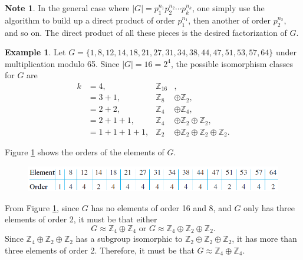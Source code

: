 \documentclass{article}
\theoremstyle{definition}
\newtheorem{example}{Example}[section]
\newtheorem{note}{Note}[section]
\begin{document}
\begin{note}
        In the general case where $|G|=p_1^{n_1}p_2^{n_2}\cdots p_k^{n_k}$, one simply use the algorithm to build up a direct product of order $p_1^{n_1}$, then another of order $p_2^{n_2}$, and so on. The direct product of all these pieces is the desired factorization of $G$.
    \end{note}
   
   \begin{example}
    Let $G=\{1,8,12,14,18,21,27,31,34,38,44,47,51,53,57,64\}$ under multiplication modulo 65. Since $|G|=16=2^4$,  the possible isomorphism classes for $G$ are
        \begin{align*}
           k&=4, & \mathbb{Z}_{16}&,\\
           &=3+1, & \mathbb{Z}_8&\oplus\mathbb{Z}_2,\\
           &=2+2, & \mathbb{Z}_4&\oplus\mathbb{Z}_4,\\
           &=2+1+1, & \mathbb{Z}_4&\oplus\mathbb{Z}_2\oplus\mathbb{Z}_2,\\
           &=1+1+1+1, & \mathbb{Z}_2&\oplus\mathbb{Z}_2\oplus\mathbb{Z}_2\oplus\mathbb{Z}_2.
        \end{align*}
        
    Figure \ref{exp11.1} shows the orders of the elements of $G$.
        
        \begin{figure}[!htbp]
            \centering
            \includegraphics[width=0.95\linewidth]{figures/exp11.1.png}
            \caption{}
            \label{exp11.1}
        \end{figure}
        
        From Figure \ref{exp11.1}, since $G$ has no elements of order 16 and 8, and $G$ only has three elements of order 2, it must be that either
        \begin{equation*}
            G \approx \mathbb{Z}_4\oplus\mathbb{Z}_4 \text{ or } G \approx \mathbb{Z}_4\oplus\mathbb{Z}_2\oplus\mathbb{Z}_2.
        \end{equation*}
        Since $\mathbb{Z}_4\oplus\mathbb{Z}_2\oplus\mathbb{Z}_2$ has a subgroup isomorphic to $\mathbb{Z}_2\oplus\mathbb{Z}_2\oplus\mathbb{Z}_2$, it has more than three elements of order 2. Therefore, it must be that $G \approx \mathbb{Z}_4\oplus\mathbb{Z}_4$.
        

\end{example}
\end{document}
